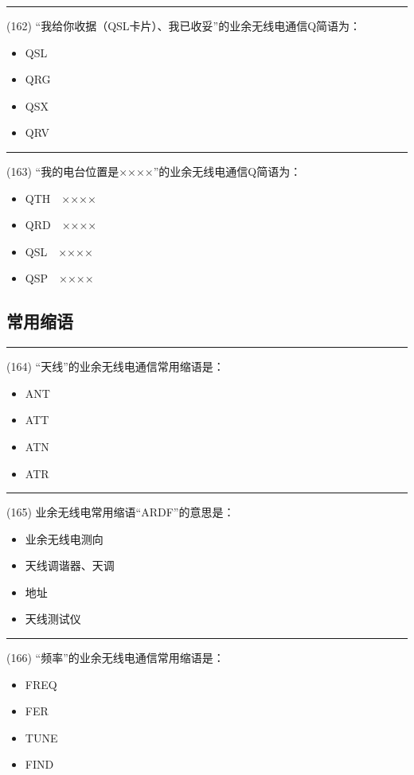 \documentclass[twocolumn,hyperref,UTF8]{ctexart}  %
\begin{document}
\noindent\rule{0.5\textwidth}{1pt}
\heiti (162) “我给你收据（QSL卡片）、我已收妥”的业余无线电通信Q简语为： \songti {\color{gray} [LK0313] }
\begin{itemize}
	\item  QSL
	\item  QRG
	\item  QSX
	\item  QRV
\end{itemize}


\noindent\rule{0.5\textwidth}{1pt}
\heiti (163) “我的电台位置是××××”的业余无线电通信Q简语为： \songti {\color{gray} [LK0321] }
\begin{itemize}
	\item  QTH　××××
	\item  QRD　××××
	\item  QSL　××××
	\item  QSP　××××
\end{itemize}


\clearpage
\subsection{常用缩语}


\noindent\rule{0.5\textwidth}{1pt}
\heiti (164) “天线”的业余无线电通信常用缩语是： \songti {\color{gray} [LK0331] }
\begin{itemize}
	\item  ANT
	\item  ATT
	\item  ATN
	\item  ATR
\end{itemize}


\noindent\rule{0.5\textwidth}{1pt}
\heiti (165) 业余无线电常用缩语“ARDF”的意思是： \songti {\color{gray} [LK0332] }
\begin{itemize}
	\item  业余无线电测向
	\item  天线调谐器、天调
	\item  地址
	\item  天线测试仪
\end{itemize}


\noindent\rule{0.5\textwidth}{1pt}
\heiti (166) “频率”的业余无线电通信常用缩语是： \songti {\color{gray} [LK0352] }
\begin{itemize}
	\item  FREQ
	\item  FER
	\item  TUNE
	\item  FIND
\end{itemize}
\end{document}
